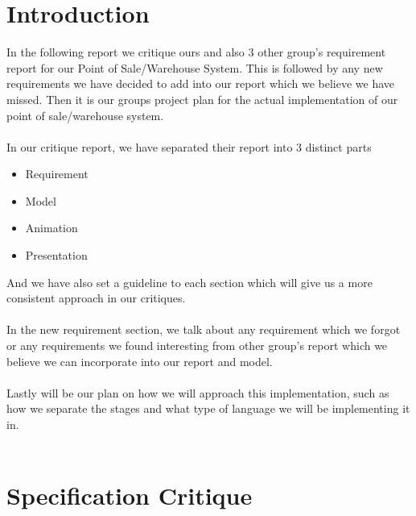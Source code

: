 \documentclass[a4paper]{article}
\begin{document}
\pagebreak


\tableofcontents
\pagebreak


\setcounter{page}{1}     %
\renewcommand{\thepage}{\arabic{page}}  %

\section{Introduction}
In the following report we critique ours and also 3 other group's requirement report for our Point of Sale/Warehouse System. This is followed by any new requirements we have decided to add into our report which we believe we have missed. Then it is our groups project plan for the actual implementation of our point of sale/warehouse system.
\\\\
In our critique report, we have separated their report into 3 distinct parts 
\begin{itemize}
\item Requirement
\item Model
\item Animation
\item Presentation

\end{itemize}

And we have also set a guideline to each section which will give us a more consistent approach in our critiques. 
\\\\
In the new requirement section, we talk about any requirement which we forgot or any requirements we found interesting from other group's report which we believe we can incorporate into our report and model. 
\\\\
Lastly will be our plan on how we will approach this implementation, such as how we separate the stages and what type of language we will be implementing it in. 
\\\


\pagebreak
\section{Specification Critique}
\end{document}
